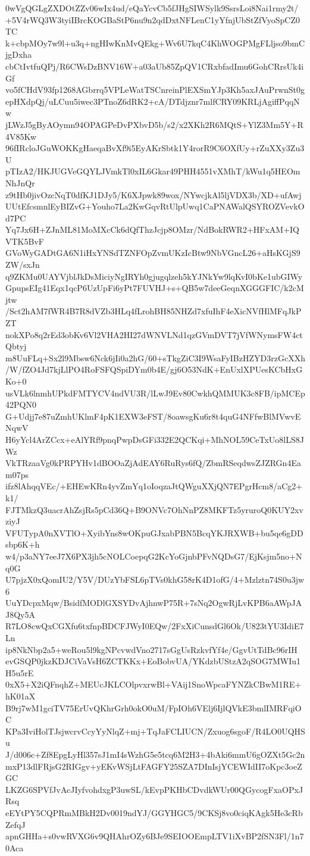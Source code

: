 0wVgQGLgZXDOtZZv06wIx4ud/eQaYcvCb5fJHgSIWSylk9SsrsLoi8Nai1rmy2t/
+5V4rWQ3W3tyiIBrcKOGBaStP6nu9n2qdDxtNFLenC1yYfnjUbStZfVyoSpCZ0TC
k+cbpMOy7w9l+u3q+ngHIwKnMvQEkg+Wv6U7kqC4KhWOGPMgFLljso9bmCjgDxha
cbCtIvtfuQPj/R6CWsDzBNV16W+a03aUb85ZpQV1CRxbfadImu6GohCRrsUk4iGf
vo5fCHdV93fp1268AGbrrq5VPLeWatTSCnreinPlEXSmYJp3Kh5axJAuPrwnSt0g
epHXdpQj/uLCuu5iwec3PTnoZ6dRK2+cA/DTdjznr7mlfCRY09KRLjAgiffPqqNw
jLWzJ5gByAOymn94OPAGPeDvPXbvD5b/s2/x2XKh2R6MQtS+YlZ3Mm5Y+R4V85Kw
96fIRcloJGuWOKKgHaeqaBvXf9i5EyAKrSbtk1Y4rorR9C6OXfUy+rZuXXy3Zu3U
pTIzA2/HKJUGVeGQYLJVmkTl0xIL6Gkar49PHH4551vXMhT/kWu1q5HEOmNhJnQr
z9tHb0jivOzcNqT0dfKJ1DJy5/K6XJpwk89wox/NYwcjkAl5ljVDX3b/XD+ufAwj
UUtEfcsmnlEyBIZvG+Youho7La2KwGqvRtUlpUwq1CaPNAWalQSYROZVevkOd7PC
Yq7Jx6H+ZJnML81MoMXcCk6dQfThzJcjp8OMzr/NdBokRWR2+HFxAM+IQVTK5BvF
GVoWyGADtGA6N1iHxYNSdTZNFOpZvmUKzIcBtw9NbVGncL26+aHsKGjS9ZW/sxJn
q9ZKMu0UAYVjblJkDsMiciyNgIRYh0gjugqlzeh5kYJNkYw9lqKvI0bKe1ubGIWy
GpupsEIg41Eqx1qcP6UzUpFi6yPt7FUVHJ+s+QB5w7deeGeqnXGGGFIC/k2cMjtw
/Sct2hAM7fWR4B7R8dVZb3HLq4fLrohBH85NHZd7xfuIhF4eXicNVfHlMFqJkPZT
nokXPo8q2rEd3obKv6Vl2VHA2HI27dWNVLNd1qzGVmDVT7jVfWNymsFW4ctQbtyj
m8UuFLq+Sx2l9Mbsw6Nck6jIi0a2hG/60+sTkgZiC3I9WsaFyIBzHZYD3rzGcXXh
/W/fZO4Jd7kjLlPO4RoFSFQSpiDYm0b4E/gj6O53NdK+EnUxlXPUesKCbHxGKo+0
usVLk6lnmhUPkdFMTYCV4ndVU3R/lLwJ9Ev80CwkhQMMUK3c8FB/ipMCEp42PQN0
G+Udjj7e87uZmhUKlmF4pK1EXW3eFST/8oawsgKu6r8t4quG4NFfwBlMVwvENqwV
H6yYcl4ArZCcx+eAlYRf9pnqPwpDsGFi332E2QCKqi+MhNOL59CeTxUo8lLS8JWz
VkTRzaaVg0kPRPYHv1dBOOaZjAdEAY6RuRys6fQ/ZbmRSeqdwsZJZRGn4Eam07ps
ifz8lAhqqVEc/+EHEwKRn4yvZmYq1oIoqzaJtQWguXXjQN7EPgrHcm8/aCg2+k1/
FJTMkzQ3uacrAhZsjRs5pCd36Q+B9ONVc7OhNnPZ8MKFTz5yruroQ0KUY2xvziyJ
VFUTypA0nXVTlO+XyibYns8wOKpuGJxabPBN5BcqYKJRXWB+bu5qe6gDDsbp6K+h
w4/p3aNY7eeJ7X6PX3jh5cNOLCoepqG2KcYoGjnbPFvNQDsG7/EjKsjm5no+Nq0G
U7pjzX0xQomIU2/Y5V/DUzYbFSL6pTVs0khG58rK4D1ofG/4+Mzlztn74S0u3jw6
UuYDcpxMqw/BsidfMODlGXSYDvAjhnwP75R+7sNq2OgwRjLvKPB6aAWpJAJ8Qy5A
R7LO8cwQxCGXfu6txfnpBDCFJWyI0EQw/2FxXiCunsdGl6Ok/U823tYU3IdiE7Ln
ip8NkNbp2a5+weRou5l9kgNPcvwdVno2717sGgUsRzkvfYf4e/GgvUtTdBc96rIH
evGSQP0jkzKDJCiVaVsH6ZCTKKx+EoBobvUA/YKdzbUStzA2qSOG7MWIu1H5u5rE
0xX5+X2iQFnqhZ+MEUcJKLCOlpvxrwBl+VAij1SnoWpcaFYNZkCBwM1RE+hK01aX
B9rj7wM1gciTV75ErUvQKhrGrh0okO0uM/FpIOh6VElj6IjlQVkE3bmlIMRFqiOC
KPa3IviHolTJsjwcrvCcyYyNlqZ+mj+TqJaFCLIUCN/Zxuog6sgoF/R4LO0UQHSu
J/d006c+Zf8EpgLyHl357sJ1mI4sWzhG5e5tcq6M2H3+4bAki6mmU6gOZXt5Gc2n
mxP13dlFRjsG2RIGgv+yEKvWSjLtFAGFY25SZA7DInIsjYCEWIdII7oKpc3oeZGC
LKZG6SPVfJvAcJIyfvohdxgP3uwSL/kEvpPKHbCDvdkWUr00QGycogFxaOPxJRsq
eEYtPY5CQPRmMBkH2Dv0019ndYJ/GGYHGC5/9CKSj8vo0ciqKAgk5He3cRbZefqJ
apnGHHa+s0vwRVXG6v9QHAhrOZy6BJe9SEIOOEmpLTV1iXvBP2fSN3Fl/1n70Aca
